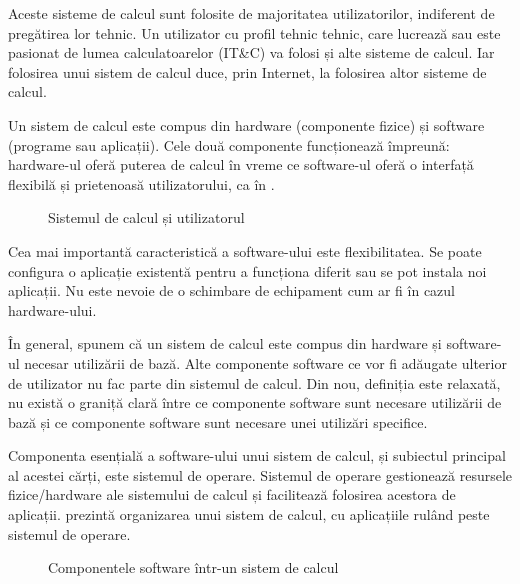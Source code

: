 Aceste sisteme de calcul sunt folosite de majoritatea utilizatorilor, indiferent de pregătirea lor tehnic.
Un utilizator cu profil tehnic tehnic, care lucrează sau este pasionat de lumea calculatoarelor (IT\&C) va folosi și alte sisteme de calcul.
Iar folosirea unui sistem de calcul duce, prin Internet, la folosirea altor sisteme de calcul.

Un sistem de calcul este compus din hardware (componente fizice) și software (programe sau aplicații).
Cele două componente funcționează împreună: hardware-ul oferă puterea de calcul în vreme ce software-ul oferă o interfață flexibilă și prietenoasă utilizatorului, ca în .

\begin{figure}[htbp]
  \centering
  \def\svgwidth{\columnwidth}
  
  \caption{Sistemul de calcul și utilizatorul}
  \label{fig:intro:computing-system}
\end{figure}

Cea mai importantă caracteristică a software-ului este flexibilitatea.
Se poate configura o aplicație existentă pentru a funcționa diferit sau se pot instala noi aplicații.
Nu este nevoie de o schimbare de echipament cum ar fi în cazul hardware-ului.

În general, spunem că un sistem de calcul este compus din hardware și software-ul necesar utilizării de bază.
Alte componente software ce vor fi adăugate ulterior de utilizator nu fac parte din sistemul de calcul.
Din nou, definiția este relaxată, nu există o graniță clară între ce componente software sunt necesare utilizării de bază și ce componente software sunt necesare unei utilizări specifice.

Componenta esențială a software-ului unui sistem de calcul, și subiectul principal al acestei cărți, este sistemul de operare.
Sistemul de operare gestionează resursele fizice/hardware ale sistemului de calcul și facilitează folosirea acestora de aplicații.
 prezintă organizarea unui sistem de calcul, cu aplicațiile rulând peste sistemul de operare.

\begin{figure}[htbp]
  \centering
  \def\svgwidth{\columnwidth}
  
  \caption{Componentele software într-un sistem de calcul}
  \label{fig:intro:computing-software}
\end{figure}

